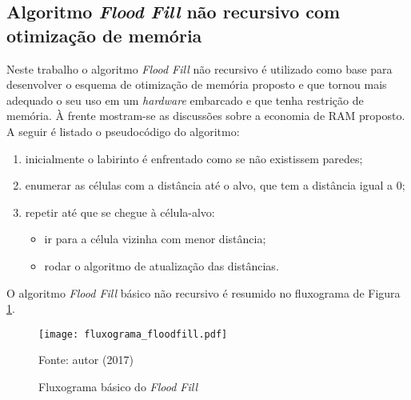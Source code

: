 \subsection{Algoritmo \emph{Flood Fill} não recursivo com otimização de memória}


Neste trabalho o algoritmo \emph{Flood Fill} não recursivo é utilizado como base para desenvolver o esquema de otimização de memória proposto e que tornou mais adequado o seu uso em um \textit{hardware} embarcado e que tenha restrição de memória. À frente mostram-se as discussões sobre a economia de RAM proposto.
%
A seguir é listado o pseudocódigo do algoritmo:
\begin{enumerate}[leftmargin=2cm,label=\alph*)]

\item inicialmente o labirinto é enfrentado como se não existissem paredes;
\item enumerar as células com a distância até o alvo, que tem a distância igual a 0;
\item repetir até que se chegue à célula-alvo:
	\begin{itemize}[label={--}]
	
	\item ir para a célula vizinha com menor distância;
	\item rodar o algoritmo de atualização das distâncias.
	
	\end{itemize}

\end{enumerate}


O algoritmo \emph{Flood Fill} básico não recursivo é resumido no fluxograma de Figura \ref{fig:diagram2}.


\begin{figure}[!htb]
	\caption{\label{fig:diagram2}Fluxograma básico do \emph{Flood Fill}}
	\begin{center}
		\texttt{[image: fluxograma\_floodfill.pdf]}
	\end{center}
	\centering
	\small Fonte: autor (2017)
\end{figure}





